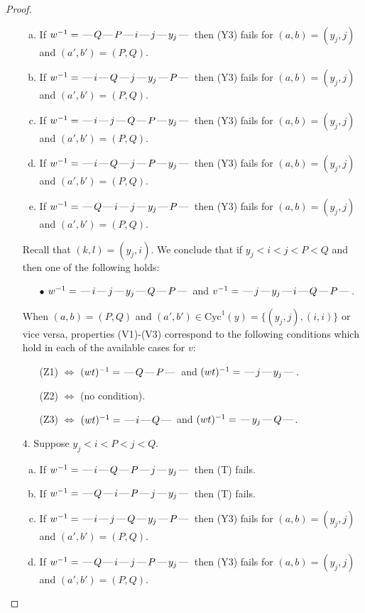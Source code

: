 \documentclass[10pt]{article}
\theoremstyle{definition}
\theoremstyle{definition}
\def\dash{\text{\hspace{0.5mm}---\hspace{0.5mm}}}
\def\Cyc{\mathrm{Cyc}}
\begin{document}
\begin{proof}
\begin{enumerate}
\begin{enumerate}[(a)]
\item If $w^{-1} = \dash Q\dash P\dash i\dash j\dash y_j\dash $ then (Y3) fails for $(a,b)=(y_j,j)$ and $(a',b')=(P,Q)$.
\item If $w^{-1} = \dash i\dash Q\dash j\dash y_j\dash P\dash $ then (Y3) fails for $(a,b)=(y_j,j)$ and $(a',b')=(P,Q)$.
\item If $w^{-1} = \dash i\dash j\dash Q\dash P\dash y_j\dash $ then (Y3) fails for $(a,b)=(y_j,j)$ and $(a',b')=(P,Q)$.
\item If $w^{-1} = \dash i\dash Q\dash j\dash P\dash y_j\dash $ then (Y3) fails for $(a,b)=(y_j,j)$ and $(a',b')=(P,Q)$.
\item If $w^{-1} = \dash Q\dash i\dash j\dash y_j\dash P\dash $ then (Y3) fails for $(a,b)=(y_j,j)$ and $(a',b')=(P,Q)$.
\end{enumerate}
Recall that $(k,l) = (y_j,i)$.
We conclude that if $y_j < i < j < P < Q$ and then one of the following holds:
\begin{enumerate}
\item[$\bullet$] $w^{-1} = \dash i\dash j\dash y_j\dash Q\dash P\dash $ and $v^{-1} = \dash j\dash y_j\dash i\dash Q\dash P\dash $.
\end{enumerate}
When $(a,b)= (P,Q)$ and $(a',b')\in \Cyc^1(y)=\{(y_j,j),(i,i)\}$ or vice versa,
properties (V1)-(V3) correspond to the following conditions which hold in
each of the available cases for $v$:
\begin{enumerate}
\item[](Z1) $\Leftrightarrow$ $(wt)^{-1} = \dash Q \dash P \dash$  and $(wt)^{-1} = \dash j \dash y_j \dash$.
\item[](Z2) $\Leftrightarrow$ (no condition).
\item[](Z3) $\Leftrightarrow$ $(wt)^{-1} = \dash i \dash Q \dash$  and $(wt)^{-1} = \dash y_j \dash Q \dash$.
\end{enumerate}
\item[$4$.] Suppose $y_j < i < P < j < Q$.
\begin{enumerate}[(a)]
\item If $w^{-1} = \dash i\dash Q\dash P\dash j\dash y_j\dash $ then (T) fails.
\item If $w^{-1} = \dash Q\dash i\dash P\dash j\dash y_j\dash $ then (T) fails.
\item If $w^{-1} = \dash i\dash j\dash Q\dash y_j\dash P\dash $ then (Y3) fails for $(a,b)=(y_j,j)$ and $(a',b')=(P,Q)$.
\item If $w^{-1} = \dash Q\dash i\dash j\dash P\dash y_j\dash $ then (Y3) fails for $(a,b)=(y_j,j)$ and $(a',b')=(P,Q)$.

\end{enumerate}
\end{enumerate}
\end{proof}
\end{document}
